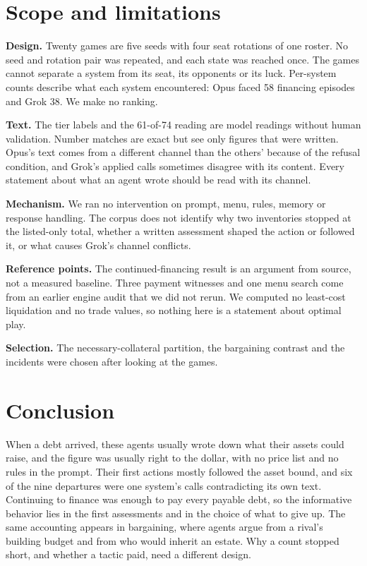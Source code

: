 \section{Scope and limitations}
\label{sec:limits}

\textbf{Design.} Twenty games are five seeds with four seat rotations of one roster. No seed and rotation pair was repeated, and each state was reached once. The games cannot separate a system from its seat, its opponents or its luck. Per-system counts describe what each system encountered: Opus faced 58 financing episodes and Grok 38. We make no ranking.

\textbf{Text.} The tier labels and the 61-of-74 reading are model readings without human validation. Number matches are exact but see only figures that were written. Opus's text comes from a different channel than the others' because of the refusal condition, and Grok's applied calls sometimes disagree with its content. Every statement about what an agent wrote should be read with its channel.

\textbf{Mechanism.} We ran no intervention on prompt, menu, rules, memory or response handling. The corpus does not identify why two inventories stopped at the listed-only total, whether a written assessment shaped the action or followed it, or what causes Grok's channel conflicts.

\textbf{Reference points.} The continued-financing result is an argument from source, not a measured baseline. Three payment witnesses and one menu search come from an earlier engine audit that we did not rerun. We computed no least-cost liquidation and no trade values, so nothing here is a statement about optimal play.

\textbf{Selection.} The necessary-collateral partition, the bargaining contrast and the incidents were chosen after looking at the games.

\section{Conclusion}

When a debt arrived, these agents usually wrote down what their assets could raise, and the figure was usually right to the dollar, with no price list and no rules in the prompt. Their first actions mostly followed the asset bound, and six of the nine departures were one system's calls contradicting its own text. Continuing to finance was enough to pay every payable debt, so the informative behavior lies in the first assessments and in the choice of what to give up. The same accounting appears in bargaining, where agents argue from a rival's building budget and from who would inherit an estate. Why a count stopped short, and whether a tactic paid, need a different design.
